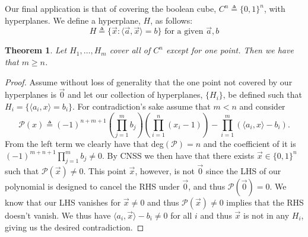 \documentclass[11pt]{article}
\newtheorem{theorem}{Theorem}
\theoremstyle{definition}
\numberwithin{equation}{subsection}
\begin{document}
Our final application is that of covering the boolean cube, $C^n\triangleq \{0,1\}^n$, with hyperplanes. We define a hyperplane, $H$, as follows: $$H\triangleq \{\vec{x}\colon \langle \vec{a}, \vec{x}\rangle=b\}\text{ for a given }\vec{a},b$$

\begin{theorem}
Let $H_1,\ldots,H_m$ cover all of $C^n$ except for one point. Then we have that $m\geq n$.
\end{theorem}

\begin{proof}
Assume without loss of generality that the one point not covered by our hyperplanes is $\vec{0}$ and let our collection of hyperplanes, $\{H_i\}$, be defined such that $H_i=\{\langle a_i,x\rangle=b_i\}$. For contradiction's sake assume that $m<n$ and consider $$\mathcal{P}(x)\triangleq(-1)^{n+m+1}\left(\prod_{j=1}^mb_j\right)\left(\prod_{i=1}^n(x_i-1)\right)-\prod_{i=1}^m\left(\langle a_i,x\rangle - b_i\right).$$ From the left term we clearly have that deg$(\mathcal{P})=n$ and the coefficient of it is $(-1)^{m+n+1}\prod_{j=1}^mb_j\neq 0.$ By CNSS we then have that there exists $\vec{x}\in\{0,1\}^n$ such that $\mathcal{P}(\vec{x})\neq0$. This point $\vec{x}$, however, is not $\vec{0}$ since the LHS of our polynomial is designed to cancel the RHS under $\vec{0}$, and thus $\mathcal{P}(\vec{0})=0$. We know that our LHS vanishes for $\vec{x}\neq 0$ and thus $\mathcal{P}(\vec{x})\neq 0$ implies that the RHS doesn't vanish. We thus have $\langle a_i,\vec{x}\rangle -b_i\neq 0$ for all $i$ and thus $\vec{x}$ is not in any $H_i$, giving us the desired contradiction.
\end{proof}

\pagebreak


\nocite{*}

\end{document}
